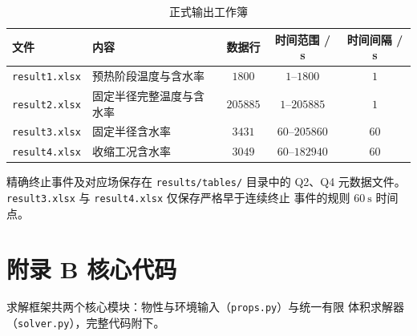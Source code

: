 \documentclass[withoutpreface,bwprint]{cumcmthesis}
\begin{document}
\begin{table}[htbp]
  \centering
  \setcounter{table}{11}
  \caption{正式输出工作簿}
  \label{tab:app-out}
  \begin{tabular}{llccc}
  \toprule
  文件 & 内容 & 数据行 & 时间范围 / s & 时间间隔 / s \\
  \midrule
  \texttt{result1.xlsx} & 预热阶段温度与含水率 & $1800$ & $1$--$1800$ & $1$ \\
  \texttt{result2.xlsx} & 固定半径完整温度与含水率 & $205885$ &
  $1$--$205885$ & $1$ \\
  \texttt{result3.xlsx} & 固定半径含水率 & $3431$ & $60$--$205860$ & $60$ \\
  \texttt{result4.xlsx} & 收缩工况含水率 & $3049$ & $60$--$182940$ & $60$ \\
  \bottomrule
  \end{tabular}
\end{table}

精确终止事件及对应场保存在 \texttt{results/tables/} 目录中的 Q2、Q4
元数据文件。
\texttt{result3.xlsx} 与 \texttt{result4.xlsx} 仅保存严格早于连续终止
事件的规则 $60\ \mathrm{s}$ 时间点。

\section*{附录 B \quad 核心代码}

求解框架共两个核心模块：物性与环境输入（\texttt{props.py}）与统一有限
体积求解器（\texttt{solver.py}），完整代码附下。




\end{document}
